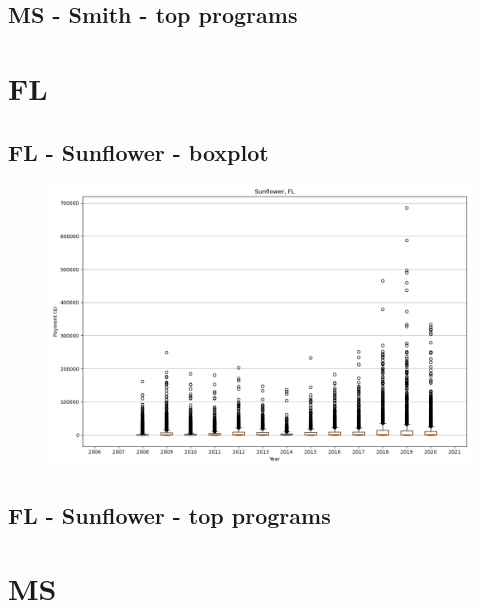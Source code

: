 \subsection*{MS - Smith - top programs}

\newpage
\section*{FL}
\subsection*{FL - Sunflower - boxplot}
\begin{figure}[h]
\centering
\includegraphics[width=7in]{../output/boxplots/counties/Sunflower-FL_boxplot.png}
\end{figure}


\subsection*{FL - Sunflower - top programs}

\newpage
\section*{MS}
